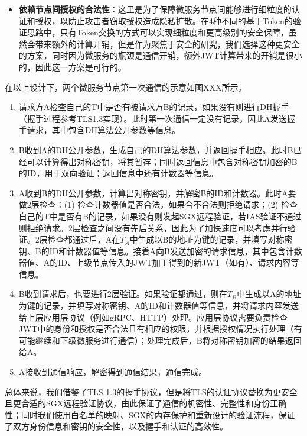 \begin{itemize}
    \item \textbf{依赖节点间授权的合法性}：这里是为了保障微服务节点间能够进行细粒度的认证和授权，以防止攻击者窃取授权造成隐私扩散。在4种不同的基于Token的验证思路中，只有Token交换的方式可以实现细粒度和更高级别的安全保障，虽然会带来额外的计算开销，但是作为聚焦于安全的研究，我们选择这种更安全的方案，同时因为微服务的瓶颈是通信开销，额外JWT计算带来的开销是很小的，因此这一方案是可行的。
\end{itemize}

在以上设计下，两个微服务节点第一次通信的示意如图XXX所示。

\begin{enumerate}
    \item 请求方A检查自己的T中是否有被请求方B的记录，如果没有则进行DH握手（握手过程参考TLS1.3实现）。此时第一次通信一定没有记录，因此A发送握手请求，其中包含DH算法公开参数等信息。
    \item B收到A的DH公开参数，生成自己的DH算法参数，并返回握手相应。此时B已经可以计算得出对称密钥，将其暂存；同时返回信息中包含对称密钥加密的B的ID，用于双向验证；返回信息中还有计数器等信息。
    \item A收到B的DH公开参数，计算出对称密钥，并解密B的ID和计数器。此时A要做2层检查：(1) 检查计数器值是否合法，如果合不合法则拒绝请求；(2) 检查自己的T中是否有B的记录，如果没有则发起SGX远程验证，若IAS验证不通过则拒绝请求。2层检查之间没有先后关系，因此为了加快速度可以考虑并行验证。2层检查都通过后，A在$T_A$中生成以B的地址为键的记录，并填写对称密钥、B的ID和计数器值等信息。接着A向B发送加密的请求信息，其中包含计数器值、A的ID、上级节点传入的JWT加工得到的新JWT（如有）、请求内容等信息。
    \item B收到请求后，也要进行2层验证。如果验证都通过，则在$T_B$中生成以A的地址为键的记录，并填写对称密钥、A的ID和计数器值等信息，并将请求内容发送给上层应用层协议（例如gRPC、HTTP）处理。应用层协议需要负责检查JWT中的身份和授权是否合法且有相应的权限，并根据授权情况执行处理（有可能继续和下级微服务进行通信）；处理完成后，B将对称密钥加密的结果返回给A。
    \item A接收到通信响应，解密得到通信结果，通信完成。
\end{enumerate}

总体来说，我们借鉴了TLS 1.3的握手协议，但是将TLS的认证协议替换为更安全且更合适的SGX远程验证协议，由此保证了通信的机密性、完整性和身份正确性；同时我们使用白名单的映射、SGX的内存保护和重新设计的验证流程，保证了双方身份信息和密钥的安全性，以及握手和认证的高效性。

